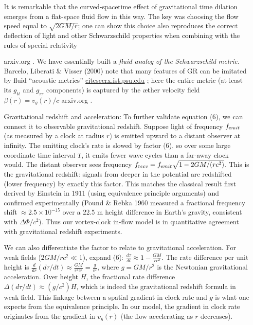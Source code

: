 \documentclass[aps,preprint,superscriptaddress]{revtex4}
\begin{document}
It is remarkable that the curved-spacetime effect of gravitational time dilation emerges from a flat-space fluid flow in this way. The key was choosing the flow speed equal to $\sqrt{2GM/r}$; one can show this choice also reproduces the correct deflection of light and other Schwarzschild properties when combining with the rules of special relativity

arxiv.org
. We have essentially built a \textit{fluid analog of the Schwarzschild metric}. Barcelo, Liberati & Visser (2000) note that many features of GR can be imitated by fluid “acoustic metrics” \href{https://citeseerx.ist.psu.edu/document?repid=rep1&type=pdf&doi=25483f1ebc9dc442a9f1505a49d96eb35e92e3f4#:~:text=References%201,in%20Cantorian%20space%20and%20average}{citeseerx.ist.psu.edu}
; here the entire metric (at least its $g_{tt}$ and $g_{rr}$ components) is captured by the æther velocity field $\beta(r)=v_g(r)/c$ arxiv.org
.


Gravitational redshift and acceleration: To further validate equation (6), we can connect it to observable gravitational redshift. Suppose light of frequency $f_{\textrm emit}$ (as measured by a clock at radius $r$) is emitted upward to a distant observer at infinity. The emitting clock’s rate is slowed by factor (6), so over some large coordinate time interval $T$, it emits fewer wave cycles than a far-away clock would. The distant observer sees frequency $f_{\textrm recv} = f_{\textrm emit}\sqrt{1-2GM/(rc^2)}$. This is the gravitational redshift: signals from deeper in the potential are redshifted (lower frequency) by exactly this factor. This matches the classical result first derived by Einstein in 1911 (using equivalence principle arguments) and confirmed experimentally (Pound & Rebka 1960 measured a fractional frequency shift $\approx 2.5\times10^{-15}$ over a 22.5 m height difference in Earth’s gravity, consistent with $\Delta \Phi/c^2$). Thus our vortex-clock in-flow model is in quantitative agreement with gravitational redshift experiments.


We can also differentiate the factor to relate to gravitational acceleration. For weak fields ($2GM/rc^2 \ll 1$), expand (6): $\frac{d\tau}{dt} \approx 1 - \frac{GM}{r c^2}$. The rate difference per unit height is $\frac{d}{dr}(d\tau/dt) \approx \frac{GM}{r^2 c^2} = \frac{g}{c^2}$, where $g=GM/r^2$ is the Newtonian gravitational acceleration. Over height $H$, the fractional rate difference $\Delta(d\tau/dt) \approx (g/c^2) H$, which is indeed the gravitational redshift formula in weak field. This linkage between a spatial gradient in clock rate and $g$ is what one expects from the equivalence principle. In our model, the gradient in clock rate originates from the gradient in $v_g(r)$ (the flow accelerating as $r$ decreases).
\end{document}
